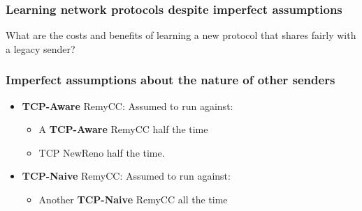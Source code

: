 \begin{frame}
\frametitle{Learning network protocols despite imperfect assumptions}
\begin{centering}
What are the costs and benefits of learning a new protocol that shares fairly with a legacy sender?
\end{centering}
\end{frame}

\begin{frame}
\frametitle{Imperfect assumptions about the nature of other senders}
\begin{itemize}
\item<1-> \textbf{TCP-Aware} RemyCC: Assumed to run against:
 \begin{itemize}
 \item A \textbf{TCP-Aware} RemyCC half the time
 \item TCP NewReno half the time.
 \end{itemize}
\item<2-> \textbf{TCP-Naive} RemyCC: Assumed to run against:
 \begin{itemize}
 \item Another \textbf{TCP-Naive} RemyCC all the time
 \end{itemize}
\end{itemize}
\end{frame}

